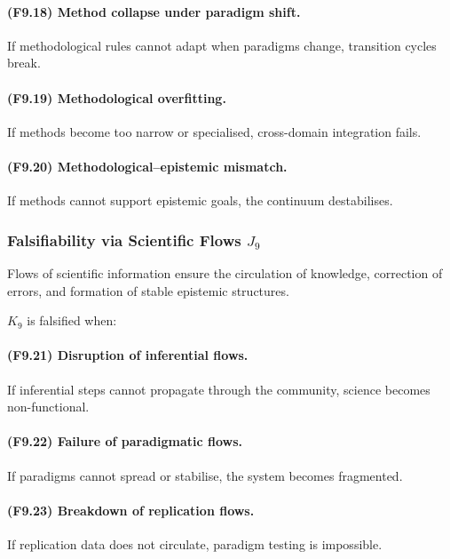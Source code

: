 \paragraph{(F9.18) Method collapse under paradigm shift.}
If methodological rules cannot adapt when paradigms change,
transition cycles break.

\paragraph{(F9.19) Methodological overfitting.}
If methods become too narrow or specialised,
cross-domain integration fails.

\paragraph{(F9.20) Methodological–epistemic mismatch.}
If methods cannot support epistemic goals,
the continuum destabilises.



\subsubsection{Falsifiability via Scientific Flows \texorpdfstring{$J_9$}{J_9}}

Flows of scientific information ensure the circulation of knowledge,
correction of errors, and formation of stable epistemic structures.

$K_9$ is falsified when:

\paragraph{(F9.21) Disruption of inferential flows.}
If inferential steps cannot propagate through the community,
science becomes non-functional.

\paragraph{(F9.22) Failure of paradigmatic flows.}
If paradigms cannot spread or stabilise,
the system becomes fragmented.

\paragraph{(F9.23) Breakdown of replication flows.}
If replication data does not circulate,
paradigm testing is impossible.

